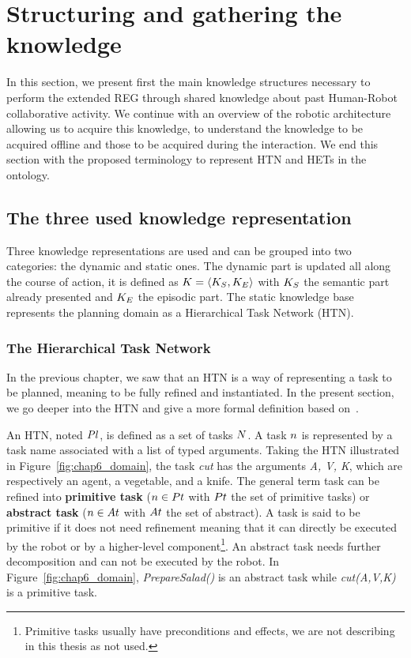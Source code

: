 \section{Structuring and gathering the knowledge}

In this section, we present first the main knowledge structures necessary to perform the extended REG through shared knowledge about past Human-Robot collaborative activity. We continue with an overview of the robotic architecture allowing us to acquire this knowledge, to understand the knowledge to be acquired offline and those to be acquired during the interaction. We end this section with the proposed terminology to represent HTN and HETs in the ontology.

\subsection{The three used knowledge representation}

Three knowledge representations are used and can be grouped into two categories: the dynamic and static ones. The dynamic part is updated all along the course of action, it is defined as $K = \langle K_S, K_E \rangle$ with $K_S$ the semantic part already presented and $K_E$ the episodic part. The static knowledge base represents the planning domain as a Hierarchical Task Network (HTN).

\subsubsection{The Hierarchical Task Network}

In the previous chapter, we saw that an HTN is a way of representing a task to be planned, meaning to be fully refined and instantiated. In the present section, we go deeper into the HTN and give a more formal definition based on~\cite{erol_1994_htn}.

An HTN, noted $Pl$, is defined as a set of tasks $N$. A task $n$ is represented by a task name associated with a list of typed arguments. Taking the HTN illustrated in Figure~\ref{fig:chap6_domain}, the task \textit{cut} has the arguments \textit{A, V, K}, which are respectively an agent, a vegetable, and a knife. The general term task can be refined into \textbf{primitive task} ($n \in Pt$ with $Pt$ the set of primitive tasks) or \textbf{abstract task} ($n \in At$ with $At$ the set of abstract). A task is said to be primitive if it does not need refinement meaning that it can directly be executed by the robot or by a higher-level component\footnote{Primitive tasks usually have preconditions and effects, we are not describing in this thesis as not used.}. An abstract task needs further decomposition and can not be executed by the robot. In Figure~\ref{fig:chap6_domain}, \textit{PrepareSalad()} is an abstract task while \textit{cut(A,V,K)} is a primitive task.

